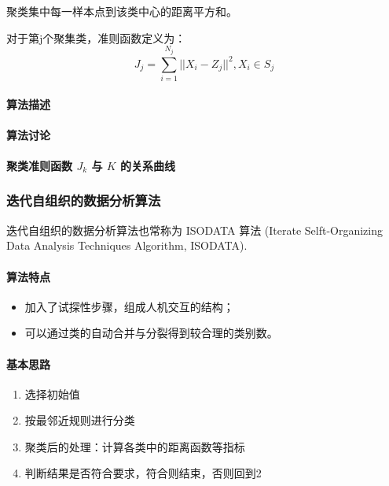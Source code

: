 \documentclass[11pt]{article}
\begin{document}
聚类集中每一样本点到该类中心的距离平方和。

对于第j个聚集类，准则函数定义为：
$$
   J_j	= \sum^{N_j}_{i=1} || X_i - Z_j ||^2, X_i \in S_j
$$

\paragraph{算法描述}%
\label{par:suan_fa_miao_shu_}

\paragraph{算法讨论}%
\label{par:suan_fa_tao_lun_}

\paragraph{聚类准则函数 $J_k$ 与 $K$ 的关系曲线}%
\label{par:ju_lei_zhun_ze_han_shu_j_k_yu_k_de_guan_xi_qu_xian_}

\subsubsection{迭代自组织的数据分析算法}%
\label{ssub:die_dai_zi_zu_zhi_de_shu_ju_fen_xi_suan_fa_}

迭代自组织的数据分析算法也常称为 ISODATA 算法 (Iterate Selft-Organizing Data Analysis Techniques Algorithm, ISODATA).

\paragraph{算法特点}%
\label{par:suan_fa_te_dian_}

\begin{itemize}
	\item 加入了试探性步骤，组成人机交互的结构；
	\item 可以通过类的自动合并与分裂得到较合理的类别数。
\end{itemize}

\paragraph{基本思路}%
\label{par:ji_ben_si_lu_}

\begin{enumerate}
	\item 选择初始值
	\item 按最邻近规则进行分类
	\item 聚类后的处理：计算各类中的距离函数等指标
	\item 判断结果是否符合要求，符合则结束，否则回到2
\end{enumerate}
\end{document}
